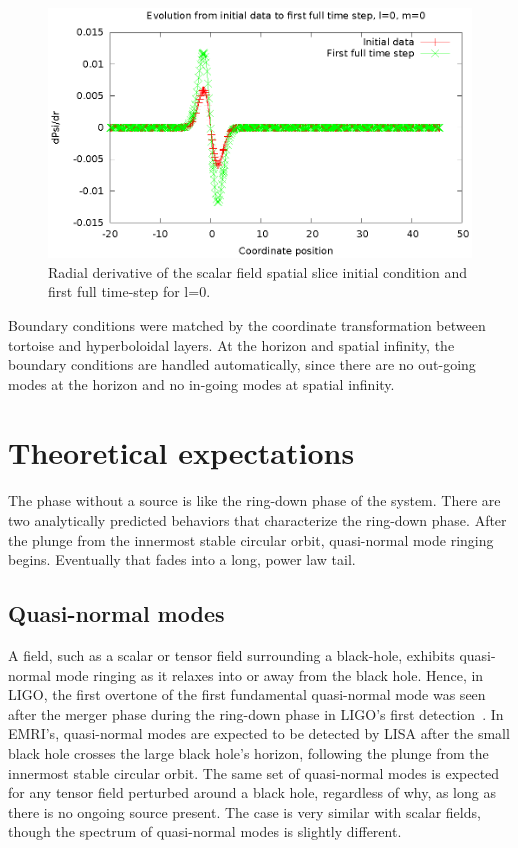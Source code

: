 \begin{figure}
  \includegraphics{phi1dl0}
  \caption{Radial derivative of the scalar field spatial slice initial condition and first full time-step for l=0.}
  \label{phi0}
\end{figure}

Boundary conditions were matched by the coordinate transformation between tortoise and hyperboloidal layers. At the horizon and spatial infinity, the boundary conditions are handled automatically, since there are no out-going modes at the horizon and no in-going modes at spatial infinity.

\section{Theoretical expectations}

The phase without a source is like the ring-down phase of the system. There are two analytically predicted behaviors that characterize the ring-down phase. After the plunge from the innermost stable circular orbit, quasi-normal mode ringing begins. Eventually that fades into a long, power law tail.

\subsection{Quasi-normal modes}
A field, such as a scalar or tensor field surrounding a black-hole, exhibits quasi-normal mode ringing as it relaxes into or away from the black hole.  Hence, in LIGO, the first overtone of the first fundamental quasi-normal mode was seen after the merger phase during the ring-down phase in LIGO's first detection~\cite{LIGO1e}. In EMRI's, quasi-normal modes are expected to be detected by LISA after the small black hole crosses the large black hole's horizon, following the plunge from the innermost stable circular orbit. The same set of quasi-normal modes is expected for any tensor field perturbed around a black hole, regardless of why, as long as there is no ongoing source present. The case is very similar with scalar fields, though the spectrum of quasi-normal modes is slightly different.


